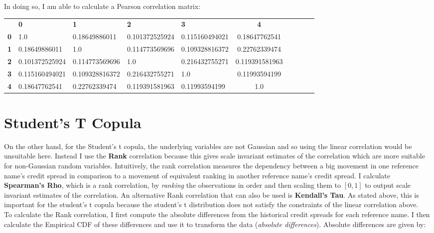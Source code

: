 \documentclass{report}
\theoremstyle{plain}
\theoremstyle{definition}
\begin{document}
In doing so, I am able to calculate a Pearson correlation matrix: 

\begin{center}
	\begin{tabular}{|l|l|l|l|l|c|c|c|c|c|}
		\hline
		& \textbf{0} & \textbf{1} & \textbf{2} & \textbf{3} & \textbf{4}\\\hhline{|=|=|=|=|=|=|}
		\textbf{0} & 1.0 & 0.18649886011 & 0.101372525924 & 0.115160494021 & 0.18647762541\\
		\textbf{1} & 0.18649886011 & 1.0 & 0.114773569696 & 0.109328816372 & 0.22762339474\\
		\textbf{2} & 0.101372525924 & 0.114773569696 & 1.0 & 0.216432755271 & 0.119391581963\\
		\textbf{3} & 0.115160494021 & 0.109328816372 & 0.216432755271 & 1.0 & 0.11993594199\\
		\textbf{4} & 0.18647762541 & 0.22762339474 & 0.119391581963 & 0.11993594199 & 1.0\\
		\hline
	\end{tabular}
\end{center}

\section{Student's T Copula}

On the other hand, for the Student's t copula, the underlying variables are not Gaussian and so using the linear correlation would be unsuitable here. Instead I use the \textbf{Rank} correlation because this gives scale invariant estimates of the correlation which are more suitable for non-Gaussian random variables. Intuitively, the rank correlation measures the dependency between a big movement in one reference name's credit spread in comparison to a movement of equivalent ranking in another reference name's credit spread. I calculate \textbf{Spearman's Rho}, which is a rank correlation, by \emph{ranking} the observations in order and then scaling them to $[0,1]$ to output scale invariant estimates of the correlation. An alternative Rank correlation that can also be used is \textbf{Kendall's Tau}. As stated above, this is important for the student's t copula because the student's t distribution does not satisfy the constraints of the linear correlation above. \\

To calculate the Rank correlation, I first compute the absolute differences from the historical credit spreads for each reference name. I then calculate the Empirical CDF of these differences and use it to transform the data (\textit{absolute differences}). Absolute differences are given by:
\end{document}
